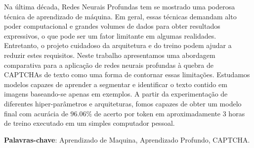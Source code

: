 \setlength{\absparsep}{18pt} %
\begin{resumo}

Na última década, Redes Neurais Profundas tem se mostrado uma poderosa técnica de aprendizado de máquina. Em geral, essas técnicas demandam alto poder computacional e grandes volumes de dados para obter resultados expressivos, o que pode ser um fator limitante em algumas realidades. Entretanto, o projeto cuidadoso da arquitetura e do treino podem ajudar a reduzir estes requisitos. Neste trabalho apresentamos uma abordagem comparativa para a aplicação de redes neurais profundas à quebra de CAPTCHAs de texto como uma forma de contornar essas limitações. Estudamos modelos capazes de aprender a segmentar e identificar o texto contido em imagens baseando-se apenas em exemplos. A partir da experimentação de diferentes hiper-parâmetros e arquiteturas, fomos capazes de obter um modelo final com acurácia de $96.06\%$ de acerto por token em aproximadamente 3 horas de treino executado em um simples computador pessoal.

\vspace{\onelineskip}

\noindent
\textbf{Palavras-chave}: Aprendizado de Maquina, Aprendizado Profundo, CAPTCHA.
\end{resumo}

